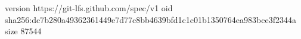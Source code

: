 version https://git-lfs.github.com/spec/v1
oid sha256:dc7b280a49362361449e7d77c8bb4639bfd1c1c01b1350764ea983bce3f2344a
size 87544
